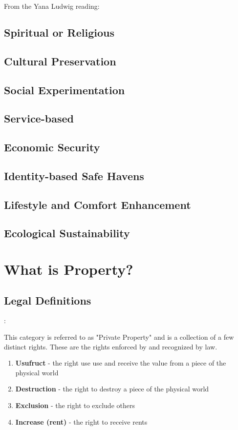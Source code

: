 \documentclass{article}
\begin{document}
From the Yana Ludwig reading:


\subsection{Spiritual or Religious}
\subsection{Cultural Preservation}
\subsection{Social Experimentation}
\subsection{Service-based}
\subsection{Economic Security}
\subsection{Identity-based Safe Havens}
\subsection{Lifestyle and Comfort Enhancement}
\subsection{Ecological Sustainability}



\pagebreak

\section{What is Property?}
\subsection{ Legal Definitions}:

This category is referred to as "Private Property" and is a collection of a few distinct rights. These are the rights enforced by and recognized by law. 

\begin{enumerate}
	
	\item \textbf{Usufruct} - the right use use and receive the value from a piece of the physical world

	\item \textbf{Destruction} - the right to destroy a piece of the physical world

	\item \textbf{Exclusion} -  the right to exclude others
 
	\item \textbf{Increase (rent)} - the right to receive rents
\end{enumerate}
	
\end{document}
